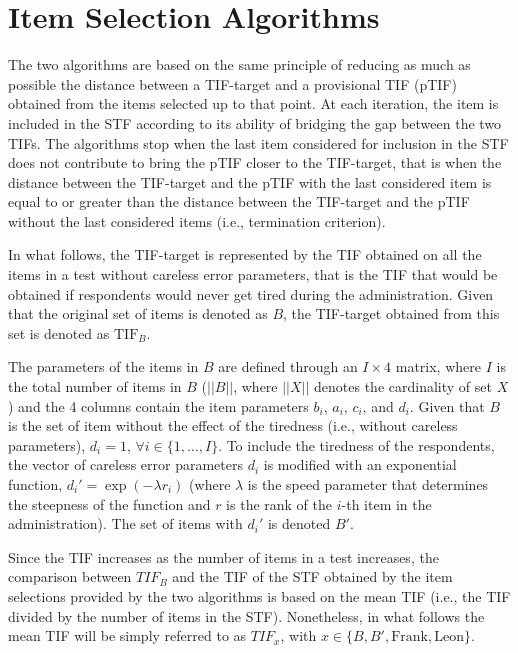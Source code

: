 \documentclass{svproc}
\begin{document}
\section{Item Selection Algorithms}



The two algorithms are based on the same principle of reducing as much as possible the distance between a TIF-target and a provisional TIF (pTIF) obtained from the items selected up to that point. 
At each iteration, the item is included in the STF according to its ability of bridging the gap between the two TIFs. 
The algorithms stop when the last item considered for inclusion in the STF does not contribute to bring the pTIF closer to the TIF-target, that is when the distance between the TIF-target and the pTIF with the last considered item is equal to or greater than the distance between the TIF-target and the pTIF without the last considered items (i.e., termination criterion). 

In what follows, the TIF-target is represented by the TIF obtained on all the items in a test without careless error parameters, that is the TIF that would be obtained if respondents would never get tired during the administration. Given that the original set of items is denoted as $B$, the TIF-target obtained from this set is denoted as $\text{TIF}_B$.

The parameters of the items in $B$ are defined through an $I \times 4$ matrix, where $I$ is the total number of items in $B$ ($||B||$, where $||X||$ denotes the cardinality of set $X$) and the 4 columns contain the item parameters $b_i$, $a_i$, $c_i$, and $d_i$. 
Given that $B$ is the set of item without the effect of the tiredness (i.e., without careless parameters), $d_i = 1$, $\forall i \in \{1, \ldots, I\}$. To include the tiredness of the respondents, the vector of careless error parameters $d_i$ is modified with an exponential function, $d_i' = \exp(-\lambda r_i)$ (where $\lambda$ is the speed parameter that determines the steepness of the function and $r$ is the rank of the $i$-th item in the administration).
The set of items with $d_i'$ is denoted $B'$.

Since the TIF increases as the number of items in a test increases, the comparison between $TIF_B$ and the TIF of the STF obtained by the item selections provided by the two algorithms is based on the mean TIF (i.e., the TIF divided by the number of items in the STF). Nonetheless, in what follows the mean TIF will be simply referred to as $TIF_x$, with $x \in \{B, B', \text{Frank}, \text{Leon}\}$.
\end{document}
